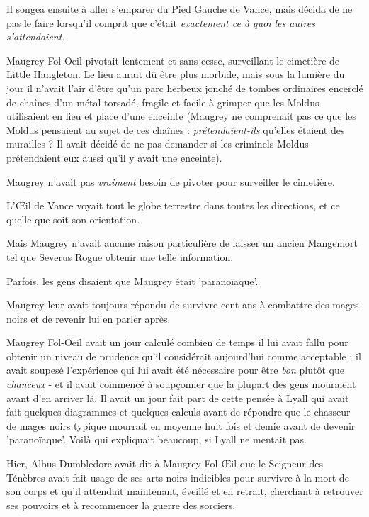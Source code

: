 Il songea ensuite à aller s'emparer du Pied Gauche de Vance, mais décida de ne pas le faire lorsqu'il comprit que c'était \emph{exactement ce à quoi les autres s'attendaient.} 

Maugrey Fol-Oeil pivotait lentement et sans cesse, surveillant le cimetière de Little Hangleton. Le lieu aurait dû être plus morbide, mais sous la lumière du jour il n'avait l'air d'être qu'un parc herbeux jonché de tombes ordinaires encerclé de chaînes d'un métal torsadé, fragile et facile à grimper que les Moldus utilisaient en lieu et place d'une enceinte (Maugrey ne comprenait pas ce que les Moldus pensaient au sujet de ces chaînes : \emph{prétendaient-ils}  qu'elles étaient des murailles ? Il avait décidé de ne pas demander si les criminels Moldus prétendaient eux aussi qu'il y avait une enceinte).

Maugrey n'avait pas \emph{vraiment}  besoin de pivoter pour surveiller le cimetière.

L'Œil de Vance voyait tout le globe terrestre dans toutes les directions, et ce quelle que soit son orientation.

Mais Maugrey n'avait aucune raison particulière de laisser un ancien Mangemort tel que Severus Rogue obtenir une telle information.

Parfois, les gens disaient que Maugrey était 'paranoïaque'.

Maugrey leur avait toujours répondu de survivre cent ans à combattre des mages noirs et de revenir lui en parler après.

Maugrey Fol-Oeil avait un jour calculé combien de temps il lui avait fallu pour obtenir un niveau de prudence qu'il considérait aujourd'hui comme acceptable ; il avait soupesé l'expérience qui lui avait été nécessaire pour être \emph{bon}  plutôt que \emph{chanceux}  - et il avait commencé à soupçonner que la plupart des gens mouraient avant d'en arriver là. Il avait un jour fait part de cette pensée à Lyall qui avait fait quelques diagrammes et quelques calculs avant de répondre que le chasseur de mages noirs typique mourrait en moyenne huit fois et demie avant de devenir 'paranoïaque'. Voilà qui expliquait beaucoup, si Lyall ne mentait pas.

Hier, Albus Dumbledore avait dit à Maugrey Fol-Œil que le Seigneur des Ténèbres avait fait usage de ses arts noirs indicibles pour survivre à la mort de son corps et qu'il attendait maintenant, éveillé et en retrait, cherchant à retrouver ses pouvoirs et à recommencer la guerre des sorciers.

